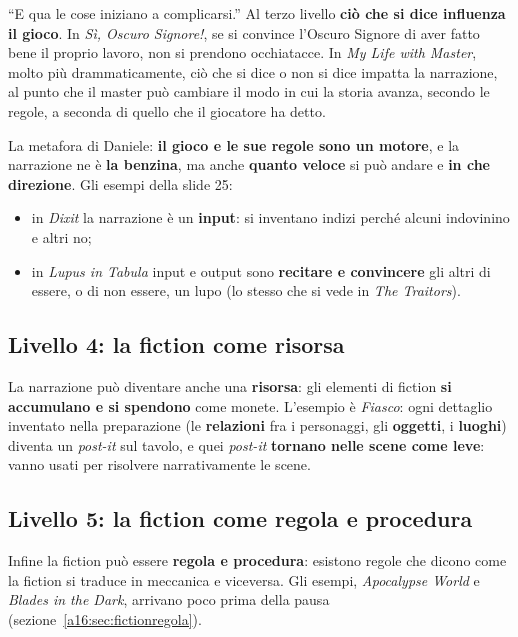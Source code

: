 ``E qua le cose iniziano a complicarsi.'' Al terzo livello \textbf{ciò che si dice influenza il
gioco}. In \emph{Sì, Oscuro Signore!}, se si convince l'Oscuro Signore di aver fatto bene il
proprio lavoro, non si prendono occhiatacce. In \emph{My Life with Master}, molto più
drammaticamente, ciò che si dice o non si dice impatta la narrazione, al punto che il master può
cambiare il modo in cui la storia avanza, secondo le regole, a seconda di quello che il giocatore
ha detto.

La metafora di Daniele: \textbf{il gioco e le sue regole sono un motore}, e la narrazione ne è
\textbf{la benzina}, ma anche \textbf{quanto veloce} si può andare e \textbf{in che direzione}. Gli
esempi della slide 25:
\begin{itemize}
  \item in \emph{Dixit} la narrazione è un \textbf{input}: si inventano indizi perché alcuni
        indovinino e altri no;
  \item in \emph{Lupus in Tabula} input e output sono \textbf{recitare e convincere} gli altri di
        essere, o di non essere, un lupo (lo stesso che si vede in \emph{The Traitors}).
\end{itemize}

\subsection{Livello 4: la fiction come risorsa}

La narrazione può diventare anche una \textbf{risorsa}: gli elementi di fiction \textbf{si
accumulano e si spendono} come monete. L'esempio è \emph{Fiasco}: ogni dettaglio inventato nella
preparazione (le \textbf{relazioni} fra i personaggi, gli \textbf{oggetti}, i \textbf{luoghi})
diventa un \emph{post-it} sul tavolo, e quei \emph{post-it} \textbf{tornano nelle scene come leve}:
vanno usati per risolvere narrativamente le scene.

\subsection{Livello 5: la fiction come regola e procedura}

Infine la fiction può essere \textbf{regola e procedura}: esistono regole che dicono come la
fiction si traduce in meccanica e viceversa. Gli esempi, \emph{Apocalypse World} e \emph{Blades in
the Dark}, arrivano poco prima della pausa (sezione~\ref{a16:sec:fictionregola}).

